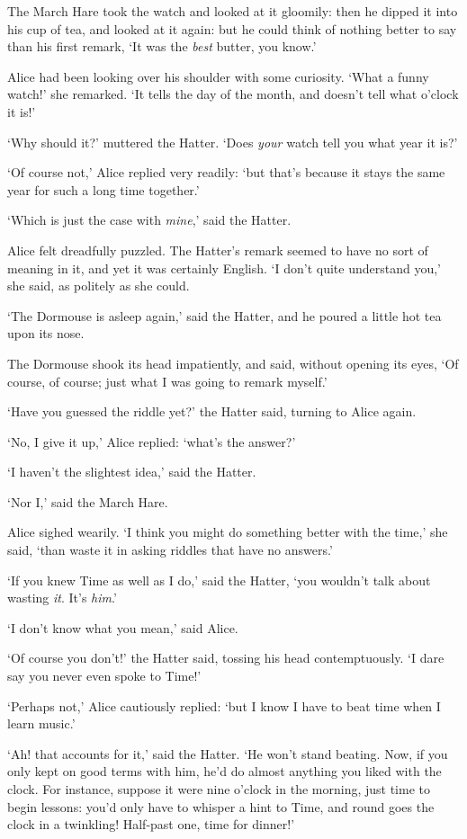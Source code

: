 \documentclass[12pt,openany]{memoir}
\begin{document}
The March Hare took the watch and looked at it gloomily: then he dipped it into his cup of tea, and looked at it again: but he could think of nothing better to say than his first remark, `It was the \textit{best} butter, you know.'

Alice had been looking over his shoulder with some curiosity. `What a funny watch!' she remarked. `It tells the day of the month, and doesn't tell what o'clock it is!'

`Why should it?' muttered the Hatter. `Does \textit{your} watch tell you what year it is?'

`Of course not,' Alice replied very readily: `but that's because it stays the same year for such a long time together.'

`Which is just the case with \textit{mine},' said the Hatter.

Alice felt dreadfully puzzled. The Hatter's remark seemed to have no sort of meaning in it, and yet it was certainly English. `I don't quite understand you,' she said, as politely as she could.

`The Dormouse is asleep again,' said the Hatter, and he poured a little hot tea upon its nose.

The Dormouse shook its head impatiently, and said, without opening its eyes, `Of course, of course; just what I was going to remark myself.'

`Have you guessed the riddle yet?' the Hatter said, turning to Alice again.

`No, I give it up,' Alice replied: `what's the answer?'

`I haven't the slightest idea,' said the Hatter.

`Nor I,' said the March Hare.

Alice sighed wearily. `I think you might do something better with the time,' she said, `than waste it in asking riddles that have no answers.'

`If you knew Time as well as I do,' said the Hatter, `you wouldn't talk about wasting \textit{it}. It's \textit{him}.'

`I don't know what you mean,' said Alice.

`Of course you don't!' the Hatter said, tossing his head contemptuously. `I dare say you never even spoke to Time!'

`Perhaps not,' Alice cautiously replied: `but I know I have to beat time when I learn music.'

`Ah! that accounts for it,' said the Hatter. `He won't stand beating. Now, if you only kept on good terms with him, he'd do almost anything you liked with the clock. For instance, suppose it were nine o'clock in the morning, just time to begin lessons: you'd only have to whisper a hint to Time, and round goes the clock in a twinkling! Half-past one, time for dinner!'
\end{document}
